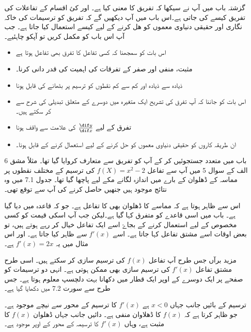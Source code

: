 
گزشتہ باب میں آپ نے سیکھا کہ تفریق کا معنی کیا ہے۔ اور کئ اقسام کے تفاعلات کی تفریق کیسے کی جاتی ہے۔اس باب میں آپ دیکھیں گے کہ تفریق کو ترسیمات کی خاکہ نگاری اور حقیقی دنیاوی معموں کو ھل کرنے کے لیے کیسے استعمال کیا جاتا ہے۔ جب آپ اس باب کو مکمل کریں تو آپکو چاہئیے۔
\begin{itemize}
\item
اس بات کو سمجھنا کہ کسی تفاعل کا تفرق بھی تفاعل ہوتا ہے
\item
مثبت، منفی اور صفر کے تفرقات کی اہمیت کی قدر دانی کرنا۔
\item
ذیادہ سے ذیادہ اور کم سے کم نقطوں کو ترسیم پر بٹھانے کی قابل ہونا
\item
اس بات کو جاننا کہ آپ تفرق کی تشریح ایک متغیرہ میں دوسرے کے متعلق تبدیلی کی شرح سے کر سکتے ہیں۔
\item
تفرق کے لیے \(\frac{\dif y}{\dif x}\)    کی علامت سے واقف ہونا
\item
ان طریقہ کاروں کو حقیقی دنیاوی معموں کو حل کرنے کے لیے استعمال کرنے کے قابل ہونا۔
\end{itemize}



باب میں متعدد جستجوئیں کر کے آپ کو تفریق سے متعارف کروایا گیا تھا۔ مثلاً مشق 6 الف کے سوال 5 میں آپ سے تفاعل \(f(X)=x^2-2\) کی ترسیم کے مختلف نقطوں پر مماسہ کے ڈھلوان کے بارے میں اندازہ لگانے مکے لیے پاچھا گیا تھا۔ جدول 7.1 میں وہ نتائج موجود ہیں جنھیں حاصل کرنے کی آپ سے توقع تھی۔

اس سے ظاہر ہوتا ہے کہ مماسے کا ڈھلوان بھی  کا تفاعل ہے۔ جو کہ قاعدہ  میں دیا گیا ہے۔ باب  میں اسی قاعدے کو متفرق کہا گیا ہے۔لیکن جب آپ اسکی قیمت کو کسی مخصوص  کے لیے استعمال کرنے کے بجاۓ اسے ایک تفاعل خیال کر رہے ہوتے ہیں، تو بعض اوقات اسے مشتق تفاعل کہا جاتا ہے۔ اسے \(f'(x)\) سے ظاہر کیا جاتا ہے۔ اور اس مثال میں یہ \(f'(x)=2x\) ہے۔

مزید برآں جس طرح آپ تفاعل \(f(x)\) کی ترسیم سازی کر سکتے ہیں۔ اسی طرح مشتق تفاعل \(f'(x)\) کی ترسیم سازی بھی ممکن ہوتی ہے۔ انہی دو ترسیمات کو صفحے پر ایک دوسرے کے اوپر ایک قطار میں دکھانا بہت دلچسپ معلوم ہوتا ہے۔ جس طرح سے سورت 7.2 میں دکھایا گیا ہے۔

ترسیم کے بائیں جانب جہاں \(x<0\) ہے \(f'(x)\) کا ترسیم  کے محور سے نیچے موجود ہے۔ جو ظاہر کرتا ہے کہ \(f(x)\) کا ڈھلاوان منفی ہے۔ دائیں جانب جہاں ڈھلوان \(f(x)\) کا مثبت ہے، وہاں \(f'(x)\) کا ترسیمہ  کے محور کے اوپر موجود ہے۔

